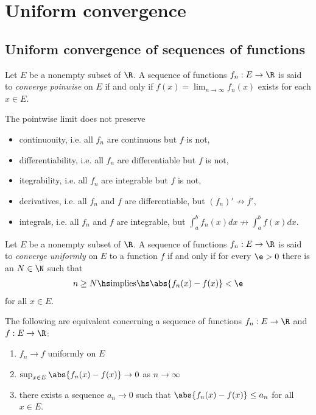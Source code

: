 \documentclass{article}
\begin{document}
\section{Uniform convergence}

\subsection{Uniform convergence of sequences of functions}

\begin{definition}[Notes 2.1]
    Let $E$ be a nonempty subset of $\R$. A sequence of functions $f_n:E\to\R$ is said to
    \emph{converge poinwise} on $E$ if and only if $f(x)=\lim_{n\to\infty}f_n(x)$ exists
    for each $x\in E$.
\end{definition}

\begin{theorem}
    The pointwise limit does not preserve
    \begin{itemize}
        \item continuouity, i.e. all $f_n$ are continuous but $f$ is not,
        \item differentiability, i.e. all $f_n$ are differentiable but $f$ is not,
        \item itegrability, i.e. all $f_n$ are integrable but $f$ is not,
        \item derivatives, i.e. all $f_n$ and $f$ are differentiable, but $(f_n)'\not\to f'$,
        \item integrals, i.e. all $f_n$ and $f$ are integrable, but $\int_a^b f_n(x)dx\not\to \int_a^b f(x)dx$.
    \end{itemize}
\end{theorem}

\begin{definition}
    Let $E$ be a nonempty subset of $\R$. A sequence of functions $f_n:E\to\R$ is said to
    \emph{converge uniformly} on $E$ to a function $f$ if and only if for every $\e>0$ there
    is an $N\in\N$ such that
    \begin{align*}
        n\geq N\hs\text{implies}\hs \abs{f_n(x)-f(x)}<\e
    \end{align*}
    for all $x\in E$.
\end{definition}

\begin{proposition}
    The following are equivalent concerning a sequence of functions $f_n:E\to\R$ and $f:E\to\R$:
    \begin{enumerate}
        \item $f_n\to f$ uniformly on $E$
        \item $\sup_{x\in E}\abs{f_n(x)-f(x)}\to 0$ as $n\to\infty$
        \item there exists a sequence $a_n\to 0$ such that $\abs{f_n(x)-f(x)}\leq a_n$ for all $x\in E$.
    \end{enumerate}
\end{proposition}
\end{document}

